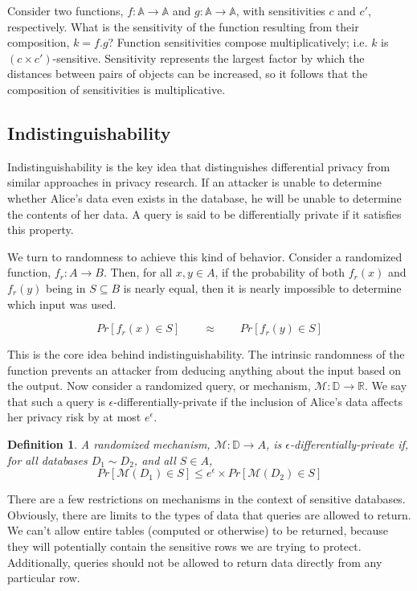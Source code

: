 \documentclass[12pt]{article}
\newtheorem{defn}{Definition}[section]
\begin{document}
Consider two functions, $f : \mathbb A \rightarrow \mathbb A$ and $g : \mathbb A \rightarrow \mathbb A$, with sensitivities $c$ and $c'$, respectively.
What is the sensitivity of the function resulting from their composition, $k = f . g$?
Function sensitivities compose multiplicatively; i.e. $k$ is $(c\times c')$-sensitive.
Sensitivity represents the largest factor by which the distances between pairs of objects can be increased, so it follows that the composition of sensitivities is multiplicative.

\subsection{Indistinguishability}

Indistinguishability is the key idea that distinguishes differential privacy from similar approaches in privacy research.
If an attacker is unable to determine whether Alice's data even exists in the database, he will be unable to determine the contents of her data.
A query is said to be differentially private if it satisfies this property.

We turn to randomness to achieve this kind of behavior.
Consider a randomized function, $f_r : A \rightarrow B$.
Then, for all $x,y \in A$, if the probability of both $f_r(x)$ and $f_r(y)$ being in $S \subseteq B$ is nearly equal, then it is nearly impossible to determine which input was used.

$$ Pr[f_r(x)\in S] \qquad\approx\qquad  Pr[f_r(y)\in S] $$

This is the core idea behind indistinguishability.
The intrinsic randomness of the function prevents an attacker from deducing anything about the input based on the output.
Now consider a randomized query, or mechanism, $\mathcal M : \mathbb D \rightarrow \mathbb R$.
We say that such a query is $\epsilon$-differentially-private if the inclusion of Alice's data affects her privacy risk by at most $e^\epsilon$. %

\begin{defn}\label{def:diffpriv}
  A randomized mechanism, $\mathcal{M} : \mathbb D \rightarrow A$, is $\epsilon$-differentially-private if, for all databases $D_1 \sim D_2$, and all $S \in A$,
  $$Pr[\mathcal M(D_1)\in S] \le e^\epsilon \times Pr[\mathcal M(D_2)\in S]$$
\end{defn}

There are a few restrictions on mechanisms in the context of sensitive databases.
Obviously, there are limits to the types of data that queries are allowed to return.
We can't allow entire tables (computed or otherwise) to be returned, because they will potentially contain the sensitive rows we are trying to protect.
Additionally, queries should not be allowed to return data directly from any particular row.
\end{document}
